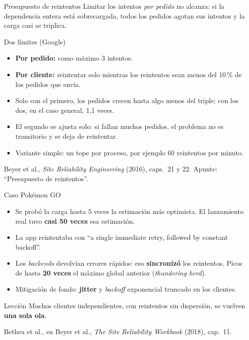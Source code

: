 \documentclass[institutional,screen,none]{ua-engineering-v6-beamer}
\begin{document}
\begin{frame}{Presupuesto de reintentos}
Limitar los intentos \emph{por pedido} no alcanza: si la dependencia entera está sobrecargada, todos los pedidos agotan sus intentos y la carga casi se triplica.

\begin{block}{Dos límites (Google)}
\begin{itemize}
\item \textbf{Por pedido:} como máximo 3 intentos.
\item \textbf{Por cliente:} reintentar solo mientras los reintentos sean menos del 10\,\% de los pedidos que envía.
\end{itemize}
\end{block}

\begin{itemize}\small
\item Solo con el primero, los pedidos crecen hasta algo menos del triple; con los dos, en el caso general, 1,1 veces.
\item El segundo se ajusta solo: si fallan muchos pedidos, el problema no es transitorio y se deja de reintentar.
\item Variante simple: un tope por proceso, por ejemplo 60 reintentos por minuto.
\end{itemize}

{\scriptsize\color{UAIngMuted}Beyer et al., \emph{Site Reliability Engineering} (2016), caps.~21 y 22. Apunte: ``Presupuesto de reintentos''.}
\end{frame}

\begin{frame}{Caso Pokémon GO}
\begin{itemize}
\item Se probó la carga hasta 5 veces la estimación más optimista. El lanzamiento real tuvo \textbf{casi 50 veces} esa estimación.
\item La app reintentaba con ``a single immediate retry, followed by constant backoff''.
\item Los \emph{backends} devolvían errores rápidos: eso \textbf{sincronizó} los reintentos. Picos de hasta \textbf{20 veces} el máximo global anterior (\emph{thundering herd}).
\item Mitigación de fondo: \textbf{jitter} y \emph{backoff} exponencial truncado en los clientes.
\end{itemize}

\begin{block}{Lección}
Muchos clientes independientes, con reintentos sin dispersión, se vuelven \textbf{una sola ola}.
\end{block}

{\scriptsize\color{UAIngMuted}Bethea et al., en Beyer et al., \emph{The Site Reliability Workbook} (2018), cap.~11.}
\end{frame}
\end{document}
